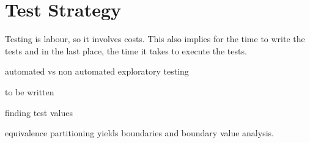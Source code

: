 \documentclass[\docroot/main]{subfiles}
\begin{document}
\chapter{Test Strategy}
Testing is labour, so it involves costs. This also implies for the
time to write the tests and in the last place, the time it takes to
execute the tests. 


automated vs non automated
exploratory testing 

to be written

finding test values


equivalence partitioning yields boundaries and boundary value
analysis.
\end{document}

